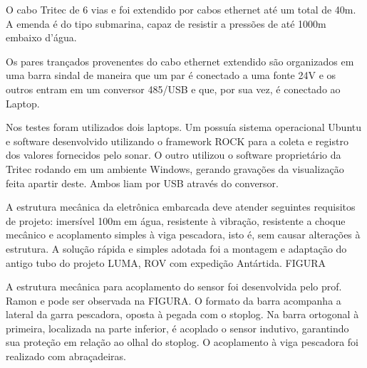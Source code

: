 O cabo Tritec de 6 vias e foi extendido por cabos ethernet até um total de 40m.
A emenda é do tipo submarina, capaz de re\-sistir a pressões de até 1000m
embaixo d'água.

Os pares trançados provenentes do cabo ethernet extendido são organizados em uma
barra sindal de maneira que um par é conectado a uma fonte 24V e os outros
entram em um conversor 485/USB e que, por sua vez, é conectado ao Laptop.

Nos testes foram utilizados dois laptops. Um possuía sistema operacional Ubuntu
e software desenvolvido utilizando o framework ROCK para a coleta e registro dos
valores fornecidos pelo sonar. O outro utilizou o software proprietário da
Tritec rodando em um ambiente Windows, gerando gravações da visualização feita
apartir deste. Ambos liam por USB através do conversor.


A estrutura mecânica da eletrônica embarcada deve atender seguintes requisitos
de projeto: imersível 100m em água, resistente à vibração, resistente a choque
mecânico e acoplamento simples à viga pescadora, isto é, sem causar alterações à
estrutura. A solução rápida e simples adotada foi a montagem e adaptação do
antigo tubo do projeto LUMA, ROV com expedição Antártida. FIGURA

A estrutura mecânica para acoplamento do sensor foi desenvolvida pelo prof.
Ramon e pode ser observada na FIGURA. O formato da barra acompanha a lateral
da garra pescadora, oposta à pegada com o stoplog. Na barra ortogonal à
primeira, localizada na parte inferior, é acoplado o sensor indutivo, garantindo
sua proteção em relação ao olhal do stoplog. O acoplamento à viga pescadora foi
realizado com abraçadeiras.




